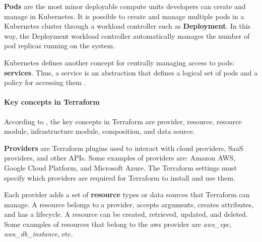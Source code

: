 \documentclass[sigconf]{acmart}
\begin{document}
\textbf{Pods} are the most minor deployable compute units developers can create and manage in Kubernetes. It is possible to create and manage multiple pods in a Kubernetes cluster through a workload controller such as \textbf{Deployment}. In this way, the Deployment workload controller automatically manages the number of pod replicas running on the system.


Kubernetes defines another concept for centrally managing access to pods: \textbf{services}. Thus, a service is an abstraction that defines a logical set of pods and a policy for accessing them \cite{kubernetes2020}.


\paragraph{\textbf{Key concepts in Terraform}}
According to \cite{terraform2022}, the key concepts in Terraform are provider, resource, resource module, infrastructure module, composition, and data source.

\textbf{Providers} are Terraform plugins used to interact with cloud providers, SaaS providers, and other APIs. Some examples of providers are: Amazon AWS, Google Cloud Platform, and Microsoft Azure. The Terraform settings must specify which providers are required for Terraform to install and use them.

Each provider adds a set of \textbf{resource} types or data sources that Terraform can manage. A resource belongs to a provider, accepts arguments, creates attributes, and has a lifecycle. A resource can be created, retrieved, updated, and deleted. Some examples of resources that belong to the aws provider are \textit{aws\_vpc}, \textit{aws\_db\_instance}, etc.


\end{document}
